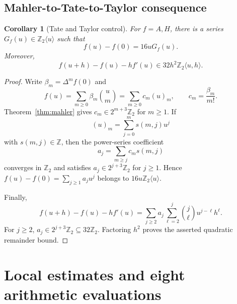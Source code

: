 \documentclass[11pt]{article}
\newtheorem{corollary}[theorem]{Corollary}
\theoremstyle{remark}\newtheorem{remark}[theorem]{Remark}
\newcommand{\Z}{\mathbb Z}\newcommand{\Q}{\mathbb Q}
\begin{document}
\subsection{Mahler-to-Tate-to-Taylor consequence}

\begin{corollary}[Tate and Taylor control]\label{cor:tate}
For $f=A,H$, there is a series $G_f(u)\in\Z_2\langle u\rangle$ such that
\[
f(u)-f(0)=16uG_f(u).
\]
Moreover,
\[
f(u+h)-f(u)-hf'(u)\in32h^2\Z_2\langle u,h\rangle.
\]
\end{corollary}

\begin{proof}
Write $\beta_m=\Delta^m f(0)$ and
\[
f(u)=\sum_{m\ge0}\beta_m\binom um
=\sum_{m\ge0}c_m(u)_m,
\qquad c_m=\frac{\beta_m}{m!}.
\]
Theorem~\ref{thm:mahler} gives $c_m\in2^{m+3}\Z_2$ for $m\ge1$.
If
\[
(u)_m=\sum_{j=0}^m s(m,j)u^j
\]
with $s(m,j)\in\Z$, then the power-series coefficient
\[
a_j=\sum_{m\ge j}c_ms(m,j)
\]
converges in $\Z_2$ and satisfies $a_j\in2^{j+3}\Z_2$ for $j\ge1$.
Hence $f(u)-f(0)=\sum_{j\ge1}a_ju^j$ belongs to
$16u\Z_2\langle u\rangle$.

Finally,
\[
f(u+h)-f(u)-hf'(u)
=\sum_{j\ge2}a_j\sum_{\ell=2}^j\binom j\ell u^{j-\ell}h^\ell.
\]
For $j\ge2$, $a_j\in2^{j+3}\Z_2\subseteq32\Z_2$.  Factoring $h^2$
proves the asserted quadratic remainder bound.
\end{proof}


\section{Local estimates and eight arithmetic evaluations}
\end{document}
